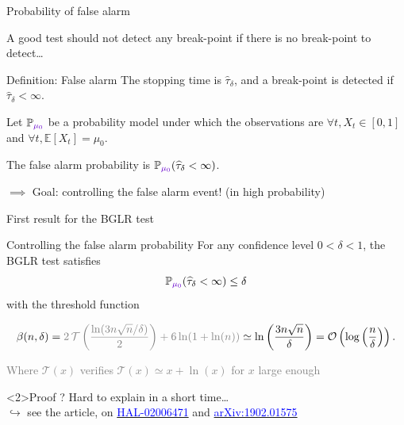\documentclass[11pt,french,ignorenonframetext,]{beamer}
\begin{document}
\begin{frame}{Probability of false alarm}

  A good test should not detect any break-point if there is no break-point to detect\ldots

  \pause
  \begin{block}{Definition: False alarm}
    The stopping time is $\widehat{\tau}_\delta$,
    and a break-point is detected if $\widehat{\tau}_\delta < \infty$.

    Let $\mathbb{P}_{\textcolor{deeppurple}{\mu_0}}$ be a probability model under which the observations are $\forall t, X_t \in[0,1]$
    and \textcolor{deeppurple}{$\forall t, \mathbb{E}[X_t] = \mu_0$}.

    The \alert{false alarm probability} is $\mathbb{P}_{\textcolor{deeppurple}{\mu_0}}(\widehat{\tau}_\delta < \infty)$.
  \end{block}

  \alert{$\implies$ Goal: controlling the false alarm event!} (in high probability)

\end{frame}

\begin{frame}{First result for the BGLR test \dSmiley{}}

  \begin{block}{Controlling the false alarm probability}
    For any \alert{confidence level} $0<\delta<1$,
    the BGLR test satisfies
    \[ \mathbb{P}_{\textcolor{deeppurple}{\mu_0}}(\widehat{\tau}_\delta < \infty) \leq \delta \]
    with the threshold function
    \begin{small}
      \[ \beta(n,\delta) = \textcolor{gray}{2\,\mathcal{T}\left(\frac{\ln(3n\sqrt{n}/\delta)}{2}\right) + 6\ln(1+\ln(n))} \simeq \ln\left(\frac{3n \sqrt{n}}{\delta}\right) = \mathcal{O}\left(\log\left(\frac{n}{\delta}\right)\right).\]
    \end{small}
    \begin{footnotesize}
      \textcolor{gray}{Where $\mathcal{T}(x)$ verifies $\mathcal{T}(x)\simeq x + \ln(x)$ for $x$ large enough}
    \end{footnotesize}
  \end{block}


  \begin{exampleblock}<2>{Proof ?}
    Hard to explain in a short time\ldots\\
    $\hookrightarrow$ see the article, on
    \href{https://hal.inria.fr/hal-02006471}{\textcolor{blue}{HAL-02006471}}
    and
    \href{https://arxiv.org/abs/1902.01575}{\textcolor{blue}{arXiv:1902.01575}}
  \end{exampleblock}

\end{frame}
\end{document}
